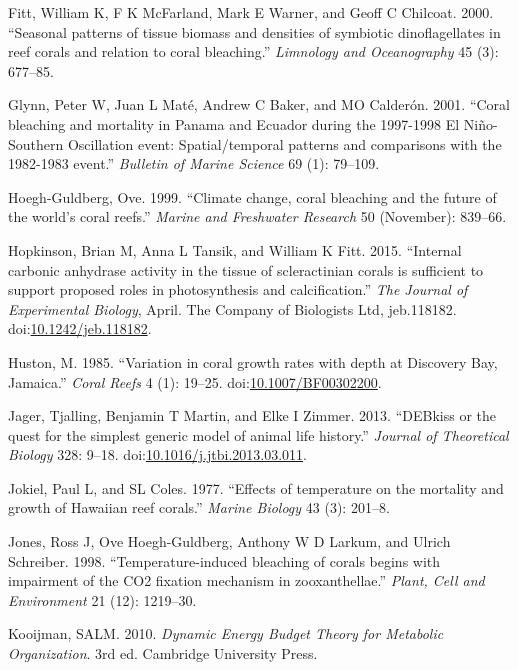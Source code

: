 \documentclass[]{elsarticle} %
\begin{document}
\hypertarget{ref-Fitt:2000p3792}{}
Fitt, William K, F K McFarland, Mark E Warner, and Geoff C Chilcoat.
2000. ``Seasonal patterns of tissue biomass and densities of symbiotic
dinoflagellates in reef corals and relation to coral bleaching.''
\emph{Limnology and Oceanography} 45 (3): 677--85.

\hypertarget{ref-Glynn:2001p7571}{}
Glynn, Peter W, Juan L Maté, Andrew C Baker, and MO Calderón. 2001.
``Coral bleaching and mortality in Panama and Ecuador during the
1997-1998 El Niño-Southern Oscillation event: Spatial/temporal patterns
and comparisons with the 1982-1983 event.'' \emph{Bulletin of Marine
Science} 69 (1): 79--109.

\hypertarget{ref-HoeghGuldberg:1999p4222}{}
Hoegh-Guldberg, Ove. 1999. ``Climate change, coral bleaching and the
future of the world's coral reefs.'' \emph{Marine and Freshwater
Research} 50 (November): 839--66.

\hypertarget{ref-Hopkinson:2015ev}{}
Hopkinson, Brian M, Anna L Tansik, and William K Fitt. 2015. ``Internal
carbonic anhydrase activity in the tissue of scleractinian corals is
sufficient to support proposed roles in photosynthesis and
calcification.'' \emph{The Journal of Experimental Biology}, April. The
Company of Biologists Ltd, jeb.118182.
doi:\href{https://doi.org/10.1242/jeb.118182}{10.1242/jeb.118182}.

\hypertarget{ref-Huston:1985ec}{}
Huston, M. 1985. ``Variation in coral growth rates with depth at
Discovery Bay, Jamaica.'' \emph{Coral Reefs} 4 (1): 19--25.
doi:\href{https://doi.org/10.1007/BF00302200}{10.1007/BF00302200}.

\hypertarget{ref-Jager:2013bj}{}
Jager, Tjalling, Benjamin T Martin, and Elke I Zimmer. 2013. ``DEBkiss
or the quest for the simplest generic model of animal life history.''
\emph{Journal of Theoretical Biology} 328: 9--18.
doi:\href{https://doi.org/10.1016/j.jtbi.2013.03.011}{10.1016/j.jtbi.2013.03.011}.

\hypertarget{ref-Jokiel:1977p7353}{}
Jokiel, Paul L, and SL Coles. 1977. ``Effects of temperature on the
mortality and growth of Hawaiian reef corals.'' \emph{Marine Biology} 43
(3): 201--8.

\hypertarget{ref-Jones:1998p3572}{}
Jones, Ross J, Ove Hoegh-Guldberg, Anthony W D Larkum, and Ulrich
Schreiber. 1998. ``Temperature-induced bleaching of corals begins with
impairment of the CO2 fixation mechanism in zooxanthellae.''
\emph{Plant, Cell and Environment} 21 (12): 1219--30.

\hypertarget{ref-Kooijman:2010vd}{}
Kooijman, SALM. 2010. \emph{Dynamic Energy Budget Theory for Metabolic
Organization}. 3rd ed. Cambridge University Press.
\end{document}
